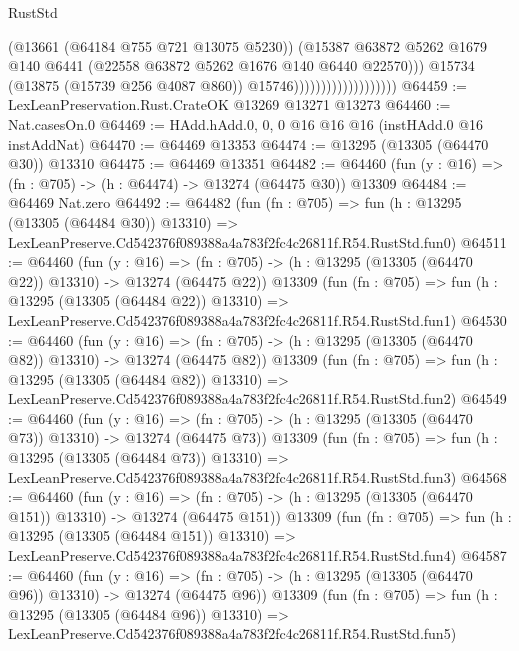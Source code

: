 \begin{lexlean}{RustStd}
\begin{coremodule}
                                            (@13661 (@64184 @755 @721 @13075 @5230))
                                            (@15387
                                              @63872
                                              @5262
                                              @1679
                                              @140
                                              @6441
                                              (@22558 @63872 @5262 @1676 @140 @6440 @22570)))
                                          @15734
                                          (@13875 (@15739 @256 @4087 @860))
                                          @15746)))))))))))))))))))
@64459 := LexLeanPreservation.Rust.CrateOK @13269 @13271 @13273
@64460 := Nat.casesOn.{0}
@64469 := HAdd.hAdd.{0, 0, 0} @16 @16 @16 (instHAdd.{0} @16 instAddNat)
@64470 := @64469 @13353
@64474 := @13295 (@13305 (@64470 @30)) @13310
@64475 := @64469 @13351
@64482 := @64460 (fun (y : @16) => (fn : @705) -> (h : @64474) -> @13274 (@64475 @30)) @13309
@64484 := @64469 Nat.zero
@64492 := @64482
    (fun (fn : @705) =>
    fun (h : @13295 (@13305 (@64484 @30)) @13310) =>
    LexLeanPreserve.Cd542376f089388a4a783f2fc4c26811f.R54.RustStd.fun0)
@64511 := @64460
    (fun (y : @16) =>
    (fn : @705) -> (h : @13295 (@13305 (@64470 @22)) @13310) -> @13274 (@64475 @22))
    @13309
    (fun (fn : @705) =>
    fun (h : @13295 (@13305 (@64484 @22)) @13310) =>
    LexLeanPreserve.Cd542376f089388a4a783f2fc4c26811f.R54.RustStd.fun1)
@64530 := @64460
    (fun (y : @16) =>
    (fn : @705) -> (h : @13295 (@13305 (@64470 @82)) @13310) -> @13274 (@64475 @82))
    @13309
    (fun (fn : @705) =>
    fun (h : @13295 (@13305 (@64484 @82)) @13310) =>
    LexLeanPreserve.Cd542376f089388a4a783f2fc4c26811f.R54.RustStd.fun2)
@64549 := @64460
    (fun (y : @16) =>
    (fn : @705) -> (h : @13295 (@13305 (@64470 @73)) @13310) -> @13274 (@64475 @73))
    @13309
    (fun (fn : @705) =>
    fun (h : @13295 (@13305 (@64484 @73)) @13310) =>
    LexLeanPreserve.Cd542376f089388a4a783f2fc4c26811f.R54.RustStd.fun3)
@64568 := @64460
    (fun (y : @16) =>
    (fn : @705) -> (h : @13295 (@13305 (@64470 @151)) @13310) -> @13274 (@64475 @151))
    @13309
    (fun (fn : @705) =>
    fun (h : @13295 (@13305 (@64484 @151)) @13310) =>
    LexLeanPreserve.Cd542376f089388a4a783f2fc4c26811f.R54.RustStd.fun4)
@64587 := @64460
    (fun (y : @16) =>
    (fn : @705) -> (h : @13295 (@13305 (@64470 @96)) @13310) -> @13274 (@64475 @96))
    @13309
    (fun (fn : @705) =>
    fun (h : @13295 (@13305 (@64484 @96)) @13310) =>
    LexLeanPreserve.Cd542376f089388a4a783f2fc4c26811f.R54.RustStd.fun5)

\end{coremodule}
\end{lexlean}
